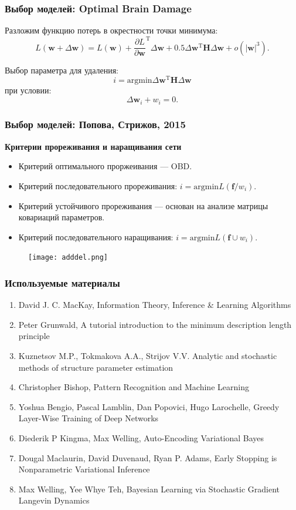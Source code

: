 \documentclass[10pt,pdf,utf8,russian,aspectratio=169]{beamer}
\begin{document}
\begin{frame}
\frametitle{Выбор моделей: Optimal Brain Damage}
Разложим функцию потерь в окрестности точки минимума:
\[
	L (\mathbf{w} + \Delta \mathbf{w}) = L (\mathbf{w})  + \frac{\partial{L}}{\partial{\mathbf{w}}}^\text{T}\Delta\mathbf{w} + 0.5\Delta\mathbf{w}^\text{T}\mathbf{H}\Delta\mathbf{w} + o(|\mathbf{w}|^3).
\]

Выбор параметра для удаления:
\[
	i = \text{argmin} \Delta\mathbf{w}^\text{T}\mathbf{H}\Delta\mathbf{w}
\]
при условии:
\[
	\Delta\mathbf{w}_i + w_i = 0.
\]
\end{frame}

\begin{frame}
\frametitle{Выбор моделей: Попова,  Стрижов, 2015}
\textbf{Критерии прореживания и наращивания сети}
\begin{itemize}
\item Критерий оптимального проржеивания --- OBD.
\item Критерий последовательного прореживания:  $i = \text{argmin} L(\mathbf{f}/{w}_i)$.
\item Критерий устойчивого прореживания --- основан на анализе матрицы ковариаций параметров.
\item Критерий последовательного наращивания:  $i = \text{argmin} L(\mathbf{f} \cup {w}_i)$.
\end{itemize}
\begin{figure}
\centering
\texttt{[image: adddel.png]}
\end{figure}
\end{frame}


\begin{frame}
\frametitle{Используемые материалы}
\begin{enumerate}
\item David J. C. MacKay, Information Theory, Inference \& Learning Algorithms
\item Peter Grunwald, A tutorial introduction to the minimum description length principle
\item Kuznetsov M.P., Tokmakova A.A., Strijov V.V. Analytic and stochastic methods of structure parameter estimation
\item Christopher Bishop, Pattern Recognition and Machine Learning
\item Yoshua Bengio, Pascal Lamblin, Dan Popovici, Hugo Larochelle, Greedy Layer-Wise Training of Deep Networks
\item Diederik P Kingma, Max Welling, Auto-Encoding Variational Bayes
\item Dougal Maclaurin, David Duvenaud, Ryan P. Adams, Early Stopping is Nonparametric Variational Inference
\item Max Welling, Yee Whye Teh, Bayesian Learning via Stochastic Gradient Langevin Dynamics
\end{enumerate}
\end{frame}
\end{document}

